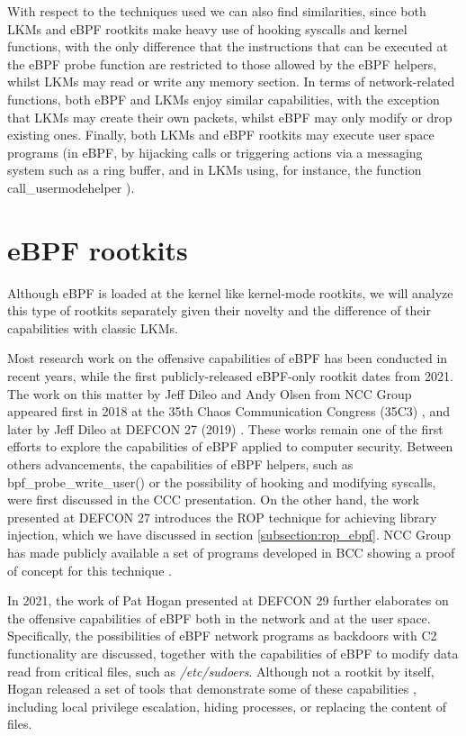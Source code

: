 With respect to the techniques used we can also find similarities, since
both LKMs and eBPF rootkits make heavy use of hooking syscalls and kernel
functions, with the only difference that the instructions that can be
executed at the eBPF probe function are restricted to those allowed by
the eBPF helpers, whilst LKMs may read or write any memory section. In
terms of network-related functions, both eBPF and LKMs enjoy similar
capabilities, with the exception that LKMs may create their own packets,
whilst eBPF may only modify or drop existing ones. Finally, both LKMs and
eBPF rootkits may execute user space programs (in eBPF, by hijacking calls
or triggering actions via a messaging system such as a ring buffer, and in
LKMs using, for instance, the function call\_usermodehelper
\cite{usermode_helper_lkm}).


\section{eBPF rootkits}
Although eBPF is loaded at the kernel like kernel-mode rootkits, we will
analyze this type of rootkits separately given their novelty and the
difference of their capabilities with classic LKMs.

Most research work on the offensive capabilities of eBPF has been conducted
in recent years, while the first publicly-released eBPF-only rootkit dates
from 2021. The work on this matter by Jeff Dileo and Andy Olsen from NCC
Group appeared first in 2018 at the 35th Chaos Communication Congress
(35C3) \cite{god_ebpf}, and later by Jeff Dileo at DEFCON 27 (2019)
\cite{evil_ebpf}. These works remain one of the first efforts to explore
the capabilities of eBPF applied to computer security. Between others
advancements, the capabilities of eBPF helpers, such as
bpf\_probe\_write\_user() or the possibility of hooking and modifying
syscalls, were first discussed in the CCC presentation. On the other
hand, the work presented at DEFCON 27 introduces the ROP technique for
achieving library injection, which we have discussed in section
\ref{subsection:rop_ebpf}. NCC Group has made publicly available a set of
programs developed in BCC showing a proof of concept for this technique
\cite{evil_ebpf_github}.

In 2021, the work of Pat Hogan presented at DEFCON 29 \cite{bad_ebpf}
further elaborates on the offensive capabilities of eBPF both in the
network and at the user space. Specifically, the possibilities of eBPF
network programs as backdoors with C2 functionality are discussed, together
with the capabilities of eBPF to modify data read from critical files, such
as \textit{/etc/sudoers}. Although not a rootkit by itself, Hogan released
a set of tools that demonstrate some of these capabilities
\cite{bad_ebpf_github}, including local privilege escalation, hiding
processes, or replacing the content of files.

